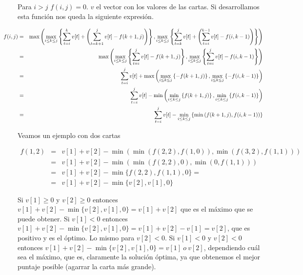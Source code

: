 Para $i > j$ $f(i,j) = 0$.
$v$ el vector con los valores de las cartas.
Si desarrollamos esta funci\'on nos queda la siguiente expresi\'on. 

\begin{eqnarray*}\hspace*{-4cm}
  f(i,j) &=& \max\left( 
      \max_{i \leq k \leq j}\left\{ \sum_{t=i}^k v[t] + \left( \sum_{t=k+1}^{j} v[t] - f(k+1,j) \right) \right\},  
      \max_{i \leq k \leq j}\left\{ \sum_{t=k}^j v[t] + \left( \sum_{t=i}^{k-1} v[t] - f(i,k-1) \right) \right\} 
    \right) \\
    &=& \max \left(
      \max_{i \leq k \leq j}\left\{ \sum_{t=i}^j v[t] - f(k+1,j) \right\},  
      \max_{i \leq k \leq j}\left\{ \sum_{t=i}^j v[t] - f(i,k-1) \right\} 
    \right) \\
    &=& \sum_{t=i}^j v[t] + \max \left(
      \max_{i \leq k \leq j}\left\{ - f(k+1,j) \right\},  
      \max_{i \leq k \leq j}\left\{ - f(i,k-1) \right\} 
    \right) \\
    &=& \sum_{t=i}^j v[t] - \min \left(
      \min_{i \leq k \leq j}\left\{ f(k+1,j) \right\},  
      \min_{i \leq k \leq j}\left\{ f(i,k-1) \right\} 
    \right) \\
    &=& \sum_{t=i}^j v[t] - \min_{i \leq k \leq j}\left\{ \min \left( f(k+1,j), f(i,k-1) \right) \right\} 
\end{eqnarray*}

Veamos un ejemplo con dos cartas

\begin{eqnarray*}
f(1,2) &=& v[1]+v[2] - \min( \min( f(2,2), f(1,0) ), \min( f(3,2), f(1,1) ) ) \\
       &=& v[1]+v[2] - \min( \min( f(2,2), 0 ), \min( 0, f(1,1) ) ) \\
       &=& v[1]+v[2] - \min\{ f(2,2), f(1,1), 0 \} = \\
		 &=& v[1]+v[2] - \min\{ v[2], v[1], 0 \}
\end{eqnarray*}

Si $v[1] \ge 0$ y $v[2] \ge 0$ entonces $v[1]+v[2] - \min\{v[2],v[1],0\} = v[1]+v[2]$ que es el máximo que se puede obtener.
Si $v[1] < 0$ entonces $v[1]+v[2] - \min\{v[2],v[1],0\} = v[1]+v[2]-v[1]=v[2]$,
que es positivo y es el óptimo. Lo mismo para $v[2] < 0$.
Si $v[1] < 0$ y $v[2] < 0$ entonces $v[1]+v[2] - \min\{v[2],v[1],0\} = v[1] ~ o ~ v[2]$, dependiendo cuál sea el máximo, que es, claramente la solución
óptima, ya que obtenemos el mejor puntaje posible (agarrar la carta más grande).

